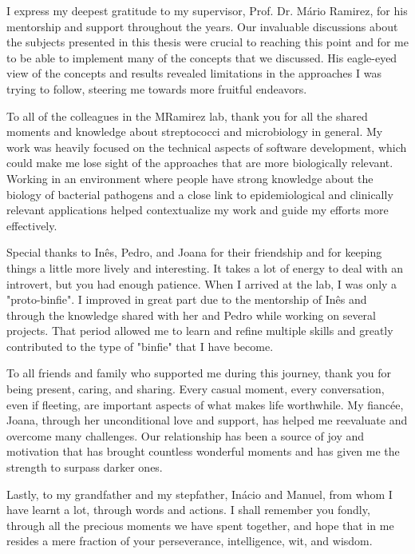 I express my deepest gratitude to my supervisor, Prof. Dr. Mário Ramirez, for his mentorship and support throughout the years. Our invaluable discussions about the subjects presented in this thesis were crucial to reaching this point and for me to be able to implement many of the concepts that we discussed. His eagle-eyed view of the concepts and results revealed limitations in the approaches I was trying to follow, steering me towards more fruitful endeavors.

To all of the colleagues in the MRamirez lab, thank you for all the shared moments and knowledge about streptococci and microbiology in general. My work was heavily focused on the technical aspects of software development, which could make me lose sight of the approaches that are more biologically relevant. Working in an environment where people have strong knowledge about the biology of bacterial pathogens and a close link to epidemiological and clinically relevant applications helped contextualize my work and guide my efforts more effectively.

Special thanks to Inês, Pedro, and Joana for their friendship and for keeping things a little more lively and interesting. It takes a lot of energy to deal with an introvert, but you had enough patience. When I arrived at the lab, I was only a "proto-binfie". I improved in great part due to the mentorship of Inês and through the knowledge shared with her and Pedro while working on several projects. That period allowed me to learn and refine multiple skills and greatly contributed to the type of "binfie" that I have become.

To all friends and family who supported me during this journey, thank you for being present, caring, and sharing. Every casual moment, every conversation, even if fleeting, are important aspects of what makes life worthwhile. My fiancée, Joana, through her unconditional love and support, has helped me reevaluate and overcome many challenges. Our relationship has been a source of joy and motivation that has brought countless wonderful moments and has given me the strength to surpass darker ones.

Lastly, to my grandfather and my stepfather, Inácio and Manuel, from whom I have learnt a lot, through words and actions. I shall remember you fondly, through all the precious moments we have spent together, and hope that in me resides a mere fraction of your perseverance, intelligence, wit, and wisdom.
